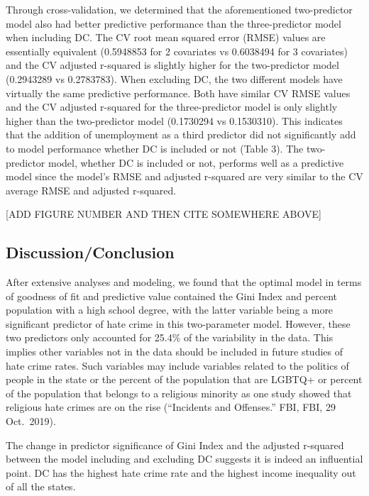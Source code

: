 \documentclass[
]{article}
\begin{document}
Through cross-validation, we determined that the aforementioned
two-predictor model also had better predictive performance than the
three-predictor model when including DC. The CV root mean squared error
(RMSE) values are essentially equivalent (0.5948853 for 2 covariates vs
0.6038494 for 3 covariates) and the CV adjusted r-squared is slightly
higher for the two-predictor model (0.2943289 vs 0.2783783). When
excluding DC, the two different models have virtually the same
predictive performance. Both have similar CV RMSE values and the CV
adjusted r-squared for the three-predictor model is only slightly higher
than the two-predictor model (0.1730294 vs 0.1530310). This indicates
that the addition of unemployment as a third predictor did not
significantly add to model performance whether DC is included or not
(Table 3). The two-predictor model, whether DC is included or not,
performs well as a predictive model since the model's RMSE and adjusted
r-squared are very similar to the CV average RMSE and adjusted
r-squared.

{[}ADD FIGURE NUMBER AND THEN CITE SOMEWHERE ABOVE{]}

\hypertarget{discussionconclusion}{%
\subsection{Discussion/Conclusion}\label{discussionconclusion}}

After extensive analyses and modeling, we found that the optimal model
in terms of goodness of fit and predictive value contained the Gini
Index and percent population with a high school degree, with the latter
variable being a more significant predictor of hate crime in this
two-parameter model. However, these two predictors only accounted for
25.4\% of the variability in the data. This implies other variables not
in the data should be included in future studies of hate crime rates.
Such variables may include variables related to the politics of people
in the state or the percent of the population that are LGBTQ+ or percent
of the population that belongs to a religious minority as one study
showed that religious hate crimes are on the rise (``Incidents and
Offenses.'' FBI, FBI, 29 Oct.~2019).

The change in predictor significance of Gini Index and the adjusted
r-squared between the model including and excluding DC suggests it is
indeed an influential point. DC has the highest hate crime rate and the
highest income inequality out of all the states.
\end{document}
